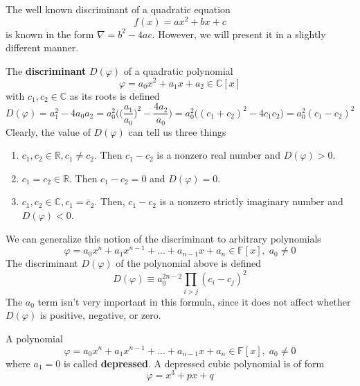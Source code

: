   The well known discriminant of a quadratic equation 
  \begin{equation}
    f(x) = ax^2 + bx + c
  \end{equation}
  is known in the form $\nabla = b^2 - 4ac$. However, we will present it in a slightly different manner. 

  \begin{definition}
    The \textbf{discriminant} $D(\varphi)$ of a quadratic polynomial
    \begin{equation}
      \varphi = a_0 x^2 + a_1 x + a_2 \in \mathbb{C}[x]
    \end{equation}
    with $c_1, c_2 \in \mathbb{C}$ as its roots is defined
    \begin{equation}
      D(\varphi) = a_1^2 - 4 a_0 a_2 = a_0^2 \bigg( \Big(\frac{a_1}{a_0} \Big)^2 - \frac{4 a_2}{a_0} \bigg) = a_0^2 \big( (c_1 + c_2)^2 - 4 c_1 c_2 \big) = a_0^2 (c_1 - c_2)^2
    \end{equation}
    Clearly, the value of $D(\varphi)$ can tell us three things
    \begin{enumerate}
      \item $c_1, c_2 \in \mathbb{R}, c_1 \neq c_2$. Then $c_1 - c_2$ is a nonzero real number and $D(\varphi) > 0$. 
      \item $c_1 = c_2 \in \mathbb{R}$. Then $c_1 - c_2 = 0$ and $D(\varphi) = 0$. 
      \item $c_1, c_2 \in \mathbb{C}, c_1 = \bar{c}_2$. Then, $c_1 - c_2$ is a nonzero strictly imaginary number and $D(\varphi) < 0$. 
    \end{enumerate}
  \end{definition}

  \begin{definition}
    We can generalize this notion of the discriminant to arbitrary polynomials
    \begin{equation}
      \varphi = a_0 x^n + a_1 x^{n-1} + ... + a_{n-1} x + a_n \in \mathbb{F}[x], \; a_0 \neq 0
    \end{equation}
    The discriminant $D(\varphi)$ of the polynomial above is defined
    \begin{equation}
      D(\varphi) \equiv a_0^{2n-2} \prod_{i>j} (c_i - c_j)^2
    \end{equation}
    The $a_0$ term isn't very important in this formula, since it does not affect whether $D(\varphi)$ is positive, negative, or zero. 
  \end{definition}

  \begin{definition}
    A polynomial 
    \begin{equation}
      \varphi = a_0 x^n + a_1 x^{n-1} + ... + a_{n-1} x + a_n \in \mathbb{F}[x], \; a_0 \neq 0
    \end{equation}
    where $a_1 = 0$ is called \textbf{depressed}. A depressed cubic polynomial is of form
    \begin{equation}
      \varphi = x^3 + p x + q
    \end{equation}
  \end{definition}

